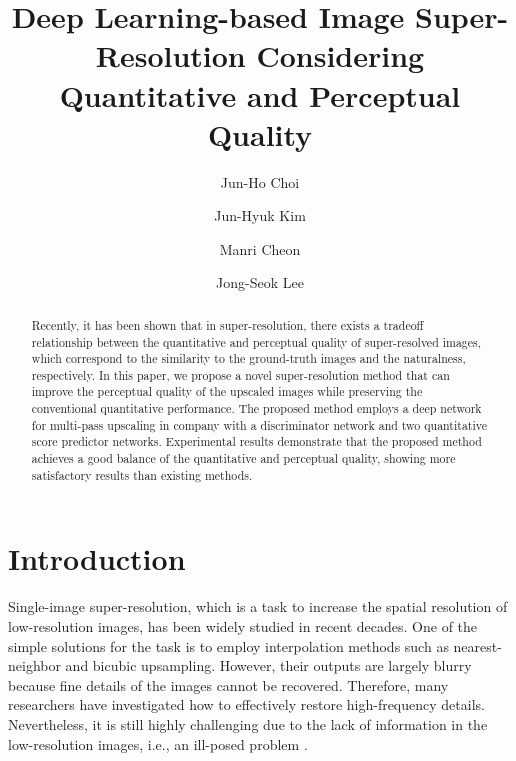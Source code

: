 \documentclass[runningheads]{llncs}
\begin{document}
\title{Deep Learning-based Image Super-Resolution Considering Quantitative and Perceptual Quality} 

\author{Jun-Ho Choi \and Jun-Hyuk Kim \and Manri Cheon \and Jong-Seok Lee}

\maketitle              \begin{abstract}
Recently, it has been shown that in super-resolution, there exists a tradeoff relationship between the quantitative and perceptual quality of super-resolved images, which correspond to the similarity to the ground-truth images and the naturalness, respectively.
In this paper, we propose a novel super-resolution method that can improve the perceptual quality of the upscaled images while preserving the conventional quantitative performance.
The proposed method employs a deep network for multi-pass upscaling in company with a discriminator network and two quantitative score predictor networks.
Experimental results demonstrate that the proposed method achieves a good balance of the quantitative and perceptual quality, showing more satisfactory results than existing methods.

\end{abstract}

\section{Introduction}

Single-image super-resolution, which is a task to increase the spatial resolution of low-resolution images, has been widely studied in recent decades.
One of the simple solutions for the task is to employ interpolation methods such as nearest-neighbor and bicubic upsampling.
However, their outputs are largely blurry because fine details of the images cannot be recovered.
Therefore, many researchers have investigated how to effectively restore high-frequency details.
Nevertheless, it is still highly challenging due to the lack of information in the low-resolution images, i.e., an ill-posed problem \cite{ledig2017photo}.
\end{document}
